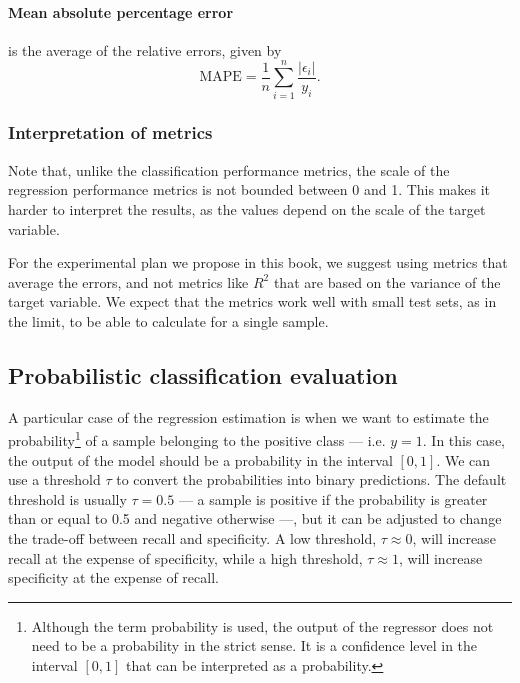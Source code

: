 \paragraph{Mean absolute percentage error} is the average of the relative errors, given by
\begin{equation*}
  \text{MAPE} = \frac{1}{n} \sum_{i=1}^n \frac{|\epsilon_i|}{y_i}\text{.}
\end{equation*}

\subsubsection{Interpretation of metrics}

Note that, unlike the classification performance metrics, the scale of the regression
performance metrics is not bounded between 0 and 1.  This makes it harder to interpret
the results, as the values depend on the scale of the target variable.

For the experimental plan we propose in this book, we suggest using metrics that average
the errors, and not metrics like $R^2$ that are based on the variance of the target
variable.  We expect that the metrics work well with small test sets, as in the limit,
to be able to calculate for a single sample.

\subsection{Probabilistic classification evaluation}

A particular case of the regression estimation is when we want to estimate the
probability\footnote{Although the term probability is used, the output of the regressor
does not need to be a probability in the strict sense.  It is a confidence level in the
interval $[0, 1]$ that can be interpreted as a probability.} of a sample belonging to the
positive class --- i.e. $y = 1$.  In this case, the output of the model should be a
probability in the interval $[0, 1]$.  We can use a threshold $\tau$ to convert the
probabilities into binary predictions.  The default threshold is usually $\tau = 0.5$ ---
a sample is positive if the probability is greater than or equal to 0.5 and negative
otherwise ---, but it can be adjusted to change the trade-off between recall and
specificity. A low threshold, $\tau \approx 0$, will increase recall at the expense of
specificity, while a high threshold, $\tau \approx 1$, will increase specificity at the
expense of recall.

